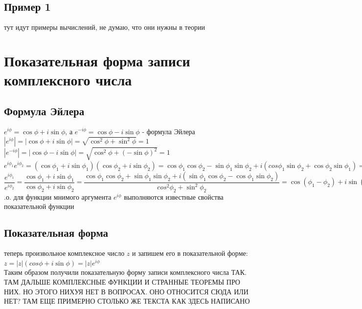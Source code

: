 \documentclass[oneside]{book}
\begin{document}
\begin{enumerate}
\begin{itemize}
\begin{enumerate}
\subsection{Пример 1}
тут идут примеры вычислений, не думаю, что они нужны в теории
\section{Показательная форма записи комплексного числа}
\subsection{Формула Эйлера}
 $e^{i\phi}=\cos\phi+i\sin\phi$, а $e^{-i\phi}=\cos\phi-i\sin\phi$ - формула Эйлера\\
$|e^{i\phi}|=|\cos\phi+i\sin\phi|=\sqrt{\cos^2\phi+\sin^2\phi}=1$\\
$|e^{-i\phi}|=|\cos\phi-i\sin\phi|=\sqrt{\cos^2\phi+(-\sin\phi)^2}=1$\\
$e^{i\phi_1}e^{i\phi_2}=(\cos\phi_1+i\sin\phi_1)(\cos\phi_2+i\sin\phi_2)=\cos\phi_1\cos\phi_2-\sin\phi_1\sin\phi_2+i(cos\phi_1\sin\phi_2+\cos\phi_2\sin\phi_1)=\cos(\phi_1+\phi_2)+i\sin(\phi_1+\phi_2)=e^{i(\phi_1+\phi_2)}$\\
$\dfrac{e^{i\phi_1}}{e^{i\phi_2}}=\dfrac{\cos\phi_1+i\sin\phi_1}{\cos\phi_2+i\sin\phi_2}=\dfrac{\cos\phi_1\cos\phi_2 + \sin\phi_1\sin\phi_2+i(\sin\phi_1\cos\phi_2-\cos\phi_1\sin\phi_2)}{cos^2\phi_2+\sin^2\phi_2}=\cos(\phi_1-\phi_2)+i\sin(\phi_1-\phi_2)=e^{i(\phi_1-\phi_2)}$
.о. для функции мнимого аргумента $e^{i\phi}$ выполняются известные свойства показательной функции
\subsection{Показательная форма}
 теперь произвольное комплексное число $z$ и запишем его в показательной форме:\\
$z=|z|(cos\phi+i\sin\phi)=|z|e^{i\phi}$\\
Таким образом получили показательную форму записи комплексного числа
ТАК. ТАМ ДАЛЬШЕ КОМПЛЕКСНЫЕ ФУНКЦИИ И СТРАННЫЕ ТЕОРЕМЫ ПРО НИХ. НО ЭТОГО НИХУЯ НЕТ В ВОПРОСАХ. ОНО ОТНОСИТСЯ СЮДА ИЛИ НЕТ? ТАМ ЕЩЕ ПРИМЕРНО СТОЛЬКО ЖЕ ТЕКСТА КАК ЗДЕСЬ НАПИСАНО
\setcounter{chapter}{30}

\end{enumerate}
\end{itemize}
\end{enumerate}
\end{document}
